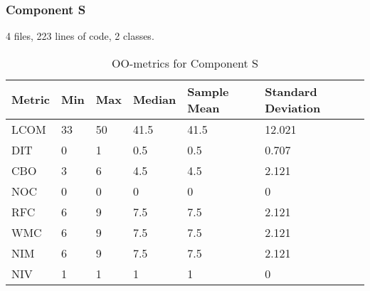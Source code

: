 \subsubsection{Component S}
4 files, 223 lines of code, 2 classes.
\begin{table}[]
\centering
\caption{OO-metrics for Component S}
\label{tab:oometrics-sys}
\begin{tabular}{|l|l|l|l|l|l|}
\hline
\textbf{Metric} & \textbf{Min} & \textbf{Max} & \textbf{Median} & \textbf{Sample Mean} & \textbf{Standard Deviation} \\ \hline
LCOM            & 33           & 50           & 41.5            & 41.5                 & 12.021                      \\ \hline
DIT             & 0            & 1            & 0.5             & 0.5                  & 0.707                       \\ \hline
CBO             & 3            & 6            & 4.5             & 4.5                  & 2.121                       \\ \hline
NOC             & 0            & 0            & 0               & 0                    & 0                           \\ \hline
RFC             & 6            & 9            & 7.5             & 7.5                  & 2.121                       \\ \hline
WMC             & 6            & 9            & 7.5             & 7.5                  & 2.121                       \\ \hline
NIM             & 6            & 9            & 7.5             & 7.5                  & 2.121                       \\ \hline
NIV             & 1            & 1            & 1               & 1                    & 0                           \\ \hline
\end{tabular}
\end{table}





